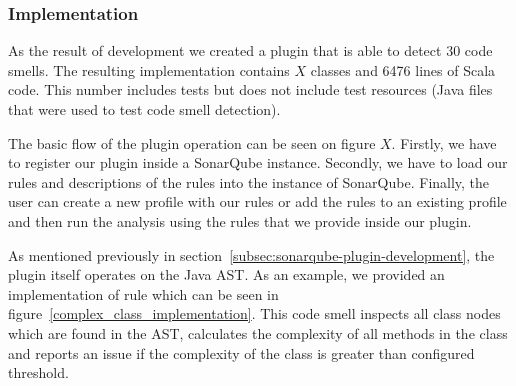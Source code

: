 
\subsubsection{Implementation}\label{subsec:implementation}



As the result of development we created a plugin that is able to detect 30 code smells.
The resulting implementation contains $X$ classes and 6476 lines of Scala code.
This number includes tests but does not include test resources (Java files that were
used to test code smell detection).


The basic flow of the plugin operation can be seen on figure $X$.
Firstly, we have to register our plugin inside a SonarQube instance.
Secondly, we have to load our rules and descriptions of the rules into the instance of SonarQube.
Finally, the user can create a new profile with our rules or add the rules to an existing
profile and then run the analysis using the rules that we provide inside our plugin.

As mentioned previously in section~\ref{subsec:sonarqube-plugin-development}, the plugin itself operates on the Java
AST\@.
As an example, we provided an implementation of  rule which can be seen in figure~\ref{complex_class_implementation}.
This code smell inspects all class nodes which are found in the AST, calculates the complexity of all methods
in the class and reports an issue if the complexity of the class is greater than configured threshold.

